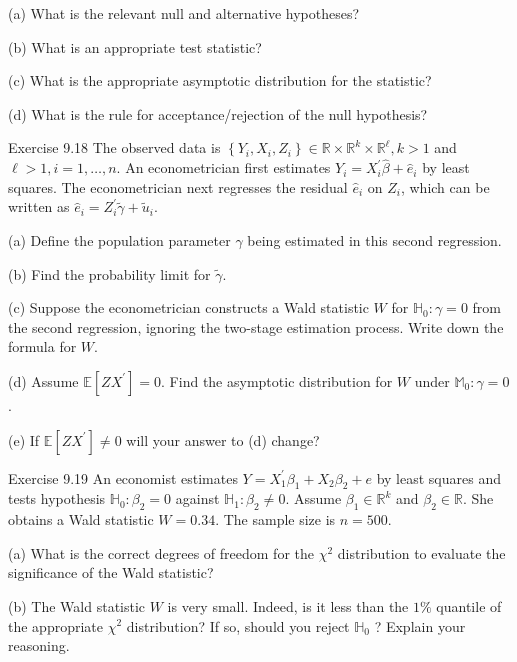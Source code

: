 \documentclass[10pt]{article}
\begin{document}
(a) What is the relevant null and alternative hypotheses?

(b) What is an appropriate test statistic?

(c) What is the appropriate asymptotic distribution for the statistic?

(d) What is the rule for acceptance/rejection of the null hypothesis?

Exercise 9.18 The observed data is $\left\{Y_{i}, X_{i}, Z_{i}\right\} \in \mathbb{R} \times \mathbb{R}^{k} \times \mathbb{R}^{\ell}, k>1$ and $\ell>1, i=1, \ldots, n$. An econometrician first estimates $Y_{i}=X_{i}^{\prime} \widehat{\beta}+\widehat{e}_{i}$ by least squares. The econometrician next regresses the residual $\widehat{e}_{i}$ on $Z_{i}$, which can be written as $\widehat{e}_{i}=Z_{i}^{\prime} \widetilde{\gamma}+\widetilde{u}_{i}$.

(a) Define the population parameter $\gamma$ being estimated in this second regression.

(b) Find the probability limit for $\widetilde{\gamma}$.

(c) Suppose the econometrician constructs a Wald statistic $W$ for $\mathbb{H}_{0}: \gamma=0$ from the second regression, ignoring the two-stage estimation process. Write down the formula for $W$.

(d) Assume $\mathbb{E}\left[Z X^{\prime}\right]=0$. Find the asymptotic distribution for $W$ under $\mathbb{M}_{0}: \gamma=0$.

(e) If $\mathbb{E}\left[Z X^{\prime}\right] \neq 0$ will your answer to (d) change?

Exercise 9.19 An economist estimates $Y=X_{1}^{\prime} \beta_{1}+X_{2} \beta_{2}+e$ by least squares and tests hypothesis $\mathbb{H}_{0}: \beta_{2}=0$ against $\mathbb{H}_{1}: \beta_{2} \neq 0$. Assume $\beta_{1} \in \mathbb{R}^{k}$ and $\beta_{2} \in \mathbb{R}$. She obtains a Wald statistic $W=0.34$. The sample size is $n=500$.

(a) What is the correct degrees of freedom for the $\chi^{2}$ distribution to evaluate the significance of the Wald statistic?

(b) The Wald statistic $W$ is very small. Indeed, is it less than the $1 \%$ quantile of the appropriate $\chi^{2}$ distribution? If so, should you reject $\mathbb{H}_{0}$ ? Explain your reasoning.
\end{document}
